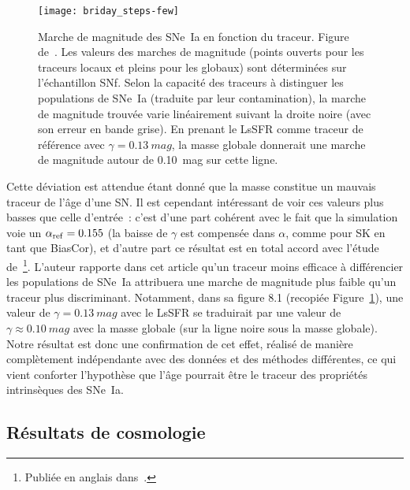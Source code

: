 \documentclass[../main/main.tex]{subfiles}
\begin{document}
\begin{figure}[t]
    \centering
    \texttt{[image: briday\_steps-few]}
    \caption[Marche de magnitude des SNe~Ia en fonction du traceur]{Marche de
        magnitude des SNe~Ia en fonction du traceur. Figure
        de~\cite{briday2021}. Les valeurs des marches de magnitude (points
        ouverts pour les traceurs locaux et pleins pour les globaux) sont
        déterminées sur l'échantillon SNf. Selon la capacité des traceurs à
        distinguer les populations de SNe~Ia (traduite par leur contamination),
        la marche de magnitude trouvée varie linéairement suivant la droite
        noire (avec son erreur en bande grise). En prenant le LsSFR comme
        traceur de référence avec $\gamma = \SI{0.13}{mag}$, la masse globale
        donnerait une marche de magnitude autour de \SI{0.10}{mag} sur cette
    ligne.}\label{fig:briday_steps}
\end{figure}

Cette déviation est attendue étant donné que la masse constitue un mauvais
traceur de l'âge d'une SN. Il est cependant intéressant de voir ces valeurs plus
basses que celle d'entrée~: c'est d'une part cohérent avec le fait que la
simulation voie un $\alpha_{\rm ref} = \num{0.155}$ (la baisse de $\gamma$ est
compensée dans $\alpha$, comme pour SK en tant que BiasCor), et d'autre part ce
résultat est en total accord avec l'étude de~\cite{briday2021}\footnote{Publiée
en anglais dans~\cite{briday2022}.}. L'auteur rapporte dans cet article qu'un
traceur moins efficace à différencier les populations de SNe~Ia attribuera une
marche de magnitude plus faible qu'un traceur plus discriminant. Notamment,
dans sa figure 8.1 (recopiée Figure~\ref{fig:briday_steps}), une valeur de
$\gamma = \SI{0.13}{mag}$ avec le LsSFR se traduirait par une valeur de $\gamma
\approx \SI{0.10}{mag}$ avec la masse globale (sur la ligne noire sous la masse
globale). Notre résultat est donc une confirmation de cet effet, réalisé de
manière complètement indépendante avec des données et des méthodes différentes,
ce qui vient conforter l'hypothèse que l'âge pourrait être le traceur des
propriétés intrinsèques des SNe~Ia.

\subsection{Résultats de cosmologie}\label{ssec:simw}
\end{document}
